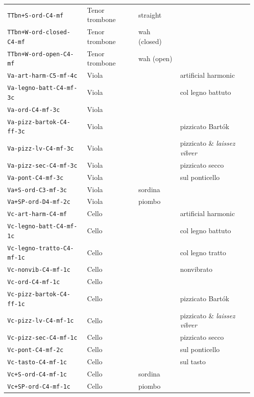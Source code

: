 \documentclass{bmcart}
\begin{document}
\begin{backmatter}
\begin{table}
\begin{tabular}{llll}
        \texttt{TTbn+S-ord-C4-mf} & Tenor trombone & straight & \\
        \texttt{TTbn+W-ord-closed-C4-mf} & Tenor trombone & wah (closed) & \\
        \texttt{TTbn+W-ord-open-C4-mf} & Tenor trombone & wah (open) & \\ \hline
        \texttt{Va-art-harm-C5-mf-4c} & Viola & & artificial harmonic \\
        \texttt{Va-legno-batt-C4-mf-3c} & Viola & & col legno battuto \\
        \texttt{Va-ord-C4-mf-3c} & Viola & & \\
        \texttt{Va-pizz-bartok-C4-ff-3c} & Viola & & pizzicato Bart\'ok \\
        \texttt{Va-pizz-lv-C4-mf-3c} & Viola & & pizzicato \& \emph{laissez vibrer} \\
        \texttt{Va-pizz-sec-C4-mf-3c} & Viola & & pizzicato secco \\
        \texttt{Va-pont-C4-mf-3c} & Viola & & sul ponticello \\
        \texttt{Va+S-ord-C3-mf-3c} & Viola & sordina & \\
        \texttt{Va+SP-ord-D4-mf-2c} & Viola & piombo & \\ \hline
        \texttt{Vc-art-harm-C4-mf} & Cello & & artificial harmonic \\
        \texttt{Vc-legno-batt-C4-mf-1c} & Cello & & col legno battuto \\
        \texttt{Vc-legno-tratto-C4-mf-1c} & Cello & & col legno tratto \\
        \texttt{Vc-nonvib-C4-mf-1c} & Cello & & nonvibrato \\
        \texttt{Vc-ord-C4-mf-1c} & Cello & & \\
        \texttt{Vc-pizz-bartok-C4-ff-1c} & Cello & & pizzicato Bart\'ok \\
        \texttt{Vc-pizz-lv-C4-mf-1c} & Cello & & pizzicato \& \emph{laissez vibrer} \\
        \texttt{Vc-pizz-sec-C4-mf-1c} & Cello & & pizzicato secco \\
        \texttt{Vc-pont-C4-mf-2c} & Cello & & sul ponticello \\
        \texttt{Vc-tasto-C4-mf-1c} & Cello & & sul tasto \\
        \texttt{Vc+S-ord-C4-mf-1c} & Cello & sordina & \\
        \texttt{Vc+SP-ord-C4-mf-1c} & Cello & piombo & \\ \hline
    \end{tabular}
\end{table}


\end{backmatter}
\end{document}
